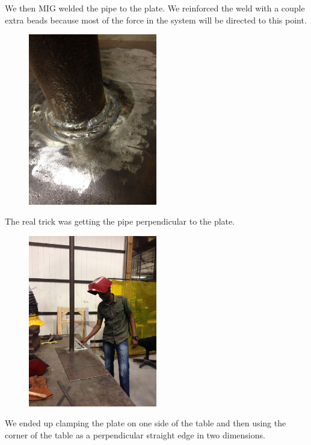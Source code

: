 \documentclass[11pt]{article} %
\begin{document}
We then MIG welded the pipe to the plate. We reinforced the weld with a couple extra beads because most of the force in the system will be directed to this point.

\begin{figure}
  \centering
  \caption{   }
  \includegraphics[width=0.50\textwidth]{roofmount/04.jpeg}
\end{figure}


The real trick was getting the pipe perpendicular to the plate.

\begin{figure}
  \centering
  \caption{   }
  \includegraphics[width=0.50\textwidth]{roofmount/05.jpeg}
\end{figure}


We ended up clamping the plate on one side of the table and then using the corner of the table as a perpendicular straight edge in two dimensions.
\end{document}
